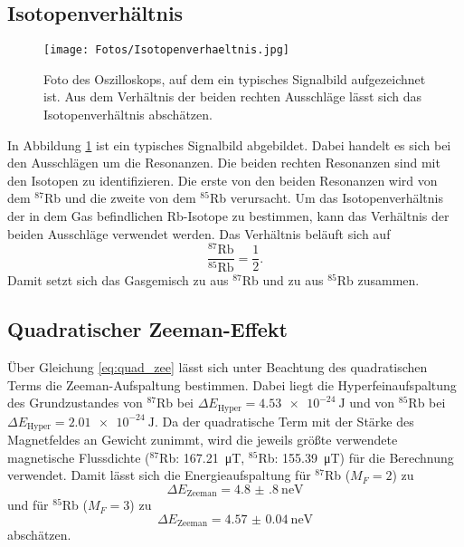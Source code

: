 \subsection{Isotopenverhältnis}

\begin{figure}
    \centering
    \texttt{[image: Fotos/Isotopenverhaeltnis.jpg]}
    \caption{Foto des Oszilloskops, auf dem ein typisches Signalbild aufgezeichnet ist. Aus dem Verhältnis der beiden rechten Ausschläge lässt sich das Isotopenverhältnis abschätzen.}
    \label{fig:Iso}
\end{figure}

In Abbildung \ref{fig:Iso} ist ein typisches Signalbild abgebildet.
Dabei handelt es sich bei den Ausschlägen um die Resonanzen.
Die beiden rechten Resonanzen sind mit den Isotopen zu identifizieren. 
Die erste von den beiden Resonanzen wird von dem  $^{87}$Rb und die zweite von dem $^{85}$Rb verursacht.
Um das Isotopenverhältnis der in dem Gas befindlichen Rb-Isotope zu bestimmen, kann das Verhältnis der beiden Ausschläge verwendet werden.
Das Verhältnis beläuft sich auf 
\begin{equation*}
    \frac{^{87}\text{Rb}}{^{85}\text{Rb}} = \frac{1}{2}.
\end{equation*}
Damit setzt sich das Gasgemisch zu  aus $^{87}$Rb und zu  aus $^{85}$Rb zusammen.


\subsection{Quadratischer Zeeman-Effekt}
Über Gleichung \eqref{eq:quad_zee} lässt sich unter Beachtung des quadratischen Terms die Zeeman-Aufspaltung bestimmen. 
Dabei liegt die Hyperfeinaufspaltung des Grundzustandes von $^{87}$Rb bei $\Delta E_{\text{Hyper}}=\SI{4.53e-24}{\joule}$ und von $^{85}$Rb bei $\Delta E_{\text{Hyper}}=\SI{2.01e-24}{\joule}$.
Da der quadratische Term mit der Stärke des Magnetfeldes an Gewicht zunimmt, wird die jeweils größte verwendete magnetische Flussdichte ($^{87}$Rb: \SI{167.21}{\micro\tesla}, $^{85}$Rb: \SI{155.39}{\micro\tesla}) für die Berechnung verwendet.
Damit lässt sich die Energieaufspaltung für $^{87}$Rb ($M_F = 2$) zu 
\begin{equation*}
    \Delta E_{\text{Zeeman}} = \SI{4.8(8)}{\nano\eV}
\end{equation*}
und für $^{85}$Rb ($M_F = 3$) zu 
\begin{equation}
    \Delta E_{\text{Zeeman}} = \SI{4.57(4)}{\nano\eV}
\end{equation}
abschätzen.



